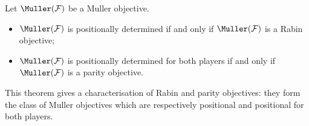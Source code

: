 \begin{theorem}
\label{2-thm:characterisation_positionally_determined_Muller_objectives}
Let $\Muller(\F)$ be a Muller objective.
\begin{itemize}
	\item $\Muller(\F)$ is positionally determined if and only if $\Muller(\F)$ is a Rabin objective;
	\item $\Muller(\F)$ is positionally determined for both players if and only if $\Muller(\F)$ is a parity objective.
\end{itemize}
\end{theorem}
This theorem gives a characterisation of Rabin and parity objectives: they form the class of Muller objectives which are respectively positional and positional for both players.

